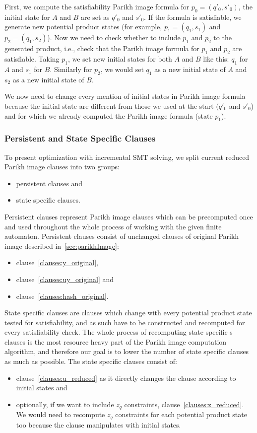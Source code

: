 First, we compute the satisfiability Parikh image formula for $p_0 = (q'_0,s'_0)$, the initial state for $A$ and $B$ are set as $q'_0$ and $s'_0$. If the formula is satisfiable, we generate new potential product states (for example, $p_1 = (q_1, s_1)$ and $p_2 = (q_1, s_2)$). Now we need to check whether to include $p_1$ and $p_2$ to the generated product, i.e., check that the Parikh image formula for $p_1$ and $p_2$ are satisfiable. Taking $p_1$, we set new initial states for both $A$ and $B$ like this: $q_1$ for $A$ and $s_1$ for $B$. Similarly for $p_2$, we would set $q_1$ as a new initial state of $A$ and $s_2$ as a new initial state of $B$.

We now need to change every mention of initial states in Parikh image formula because the initial state are different from those we used at the start ($q'_0$ and $s'_0$) and for which we already computed the Parikh image formula (state $p_1$).

\subsubsection{Persistent and State Specific Clauses}

To present optimization with incremental SMT solving, we split current reduced Parikh image clauses into two groups:
\begin{itemize}
    \item persistent clauses and
    \item state specific clauses.
\end{itemize}

Persistent clauses represent Parikh image clauses which can be precomputed once and used throughout the whole process of working with the given finite automaton. Persistent clauses consist of unchanged clauses of original Parikh image described in~\ref{sec:parikhImage}:
\begin{itemize}
    \item clause~\ref{clauses:y_original},
    \item clause~\ref{clauses:uy_original} and
    \item clause~\ref{clauses:hash_original}.
\end{itemize}

State specific clauses are clauses which change with every potential product state tested for satisfiability, and as such have to be constructed and recomputed for every satisfiability check. The whole process of recomputing state specific s clauses is the most resource heavy part of the Parikh image computation algorithm, and therefore our goal is to lower the number of state specific clauses as much as possible. The state specific clauses consist of:
\begin{itemize}
    \item clause~\ref{clauses:u_reduced} as it directly changes the clause according to initial states and
    \item optionally, if we want to include $z_{q}$ constraints, clause~\ref{clauses:z_reduced}. We would need to recompute $z_{q}$ constraints for each potential product state too because the clause manipulates with initial states.
\end{itemize}


